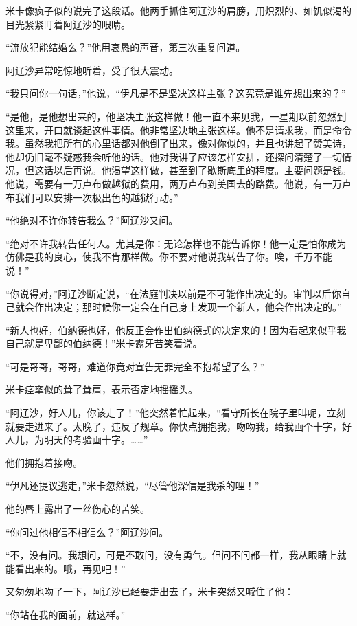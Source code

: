 \par 米卡像疯子似的说完了这段话。他两手抓住阿辽沙的肩膀，用炽烈的、如饥似渴的目光紧紧盯着阿辽沙的眼睛。
\par “流放犯能结婚么？”他用哀恳的声音，第三次重复问道。
\par 阿辽沙异常吃惊地听着，受了很大震动。
\par “我只问你一句话，”他说，“伊凡是不是坚决这样主张？这究竟是谁先想出来的？”
\par “是他，是他想出来的，他坚决主张这样做！他一直不来见我，一星期以前忽然到这里来，开口就谈起这件事情。他非常坚决地主张这样。他不是请求我，而是命令我。虽然我把所有的心里话都对他倒了出来，像对你似的，并且也讲起了赞美诗，他却仍旧毫不疑惑我会听他的话。他对我讲了应该怎样安排，还探问清楚了一切情况，但这话以后再说。他渴望这样做，甚至到了歇斯底里的程度。主要问题是钱。他说，需要有一万卢布做越狱的费用，两万卢布到美国去的路费。他说，有一万卢布我们可以安排一次极出色的越狱行动。”
\par “他绝对不许你转告我么？”阿辽沙又问。
\par “绝对不许我转告任何人。尤其是你：无论怎样也不能告诉你！他一定是怕你成为仿佛是我的良心，使我不肯那样做。你不要对他说我转告了你。唉，千万不能说！”
\par “你说得对，”阿辽沙断定说，“在法庭判决以前是不可能作出决定的。审判以后你自己就会作出决定；那时候你一定会在自己身上发现一个新人，他会作出决定的。”
\par “新人也好，伯纳德也好，他反正会作出伯纳德式的决定来的！因为看起来似乎我自己就是卑鄙的伯纳德！”米卡露牙苦笑着说。
\par “可是哥哥，哥哥，难道你竟对宣告无罪完全不抱希望了么？”
\par 米卡痉挛似的耸了耸肩，表示否定地摇摇头。
\par “阿辽沙，好人儿，你该走了！”他突然着忙起来，“看守所长在院子里叫呢，立刻就要走进来了。太晚了，违反了规章。你快点拥抱我，吻吻我，给我画个十字，好人儿，为明天的考验画十字。……”
\par 他们拥抱着接吻。
\par “伊凡还提议逃走，”米卡忽然说，“尽管他深信是我杀的哩！”
\par 他的唇上露出了一丝伤心的苦笑。
\par “你问过他相信不相信么？”阿辽沙问。
\par “不，没有问。我想问，可是不敢问，没有勇气。但问不问都一样，我从眼睛上就能看出来的。哦，再见吧！”
\par 又匆匆地吻了一下，阿辽沙已经要走出去了，米卡突然又喊住了他：
\par “你站在我的面前，就这样。”
